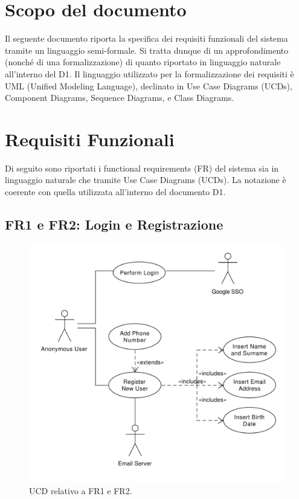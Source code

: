 \documentclass[9pt]{extarticle}
\begin{document}
\customtitle



\tableofcontents
\newpage

\section{Scopo del documento}


Il seguente documento riporta la specifica dei requisiti funzionali del sistema tramite un linguaggio semi-formale. Si tratta dunque di un approfondimento (nonché di una formalizzazione) di quanto riportato in linguaggio naturale all'interno del D1. Il linguaggio utilizzato per la formalizzazione dei requisiti è UML (Unified Modeling Language), declinato in Use Case Diagrams (UCDs), Component Diagrams, Sequence Diagrams, e Class Diagrams.

\newpage

\section{Requisiti Funzionali}

Di seguito sono riportati i functional requirements (FR) del sistema sia in linguaggio naturale che tramite Use Case Diagrams (UCDs). La notazione è coerente con quella utilizzata all'interno del documento D1.



\subsection{FR1 e FR2: Login e Registrazione} 

\begin{figure}[!htb]
	\centering
	\includegraphics[width=.7\linewidth]{./images/FR1-2.pdf}
	\caption{UCD relativo a FR1 e FR2.}
	\label{fig:UCD_FR1-2}
\end{figure}
\end{document}
